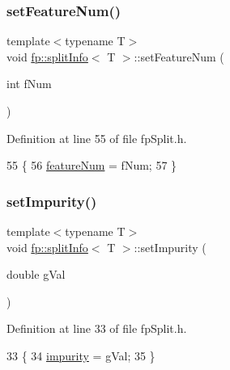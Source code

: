 \subsubsection{\texorpdfstring{set\+Feature\+Num()}{setFeatureNum()}}
{\footnotesize\ttfamily template$<$typename T$>$ \\
void \hyperlink{classfp_1_1splitInfo}{fp\+::split\+Info}$<$ T $>$\+::set\+Feature\+Num (\begin{DoxyParamCaption}\item[{int}]{f\+Num }\end{DoxyParamCaption})\hspace{0.3cm}{\ttfamily [inline]}}



Definition at line 55 of file fp\+Split.\+h.


\begin{DoxyCode}
55                                                    \{
56                     \hyperlink{classfp_1_1splitInfo_a77b83bf0d03ad4a6918a1250ddab65d2}{featureNum} = fNum;
57                 \}
\end{DoxyCode}
\mbox{\label{classfp_1_1splitInfo_a3e712b7887bd06f14ae87f6ab1ca25f6}} 
\subsubsection{\texorpdfstring{set\+Impurity()}{setImpurity()}}
{\footnotesize\ttfamily template$<$typename T$>$ \\
void \hyperlink{classfp_1_1splitInfo}{fp\+::split\+Info}$<$ T $>$\+::set\+Impurity (\begin{DoxyParamCaption}\item[{double}]{g\+Val }\end{DoxyParamCaption})\hspace{0.3cm}{\ttfamily [inline]}}



Definition at line 33 of file fp\+Split.\+h.


\begin{DoxyCode}
33                                                     \{
34                     \hyperlink{classfp_1_1splitInfo_aada04419633efd2c337ee25a654f3339}{impurity} = gVal;
35                 \}
\end{DoxyCode}
\mbox{\label{classfp_1_1splitInfo_a99e02b66f4abb2ec115181bad4e938cf}} 
